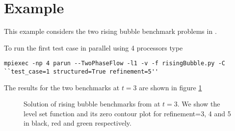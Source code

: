 \documentclass[english,11pt]{article}
\let\cite=\citet
\begin{document}
\section{Example}
This example considers the two rising bubble benchmark problems in \cite{hysing2009quantitative}. 



\vspace{2ex}
To run the first test case in parallel using 4 processors type 

\begin{lstlisting}[frame=single]
  mpiexec -np 4 parun --TwoPhaseFlow -l1 -v -f risingBubble.py -C ``test_case=1 structured=True refinement=5''
\end{lstlisting}

The results for the two benchmarks at $t=3$ are shown in figure \ref{fig:rising_bubble} 

\begin{figure}[h]
  \centering
   \qquad \qquad \qquad
  \caption{Solution of rising bubble benchmarks from \cite{hysing2009quantitative} at $t=3$.
  We show the level set function and its zero contour plot for refinement=3, 4 and 5 in black, red and green respectively.}
  \label{fig:rising_bubble}
\end{figure}


%
%

\end{document}
